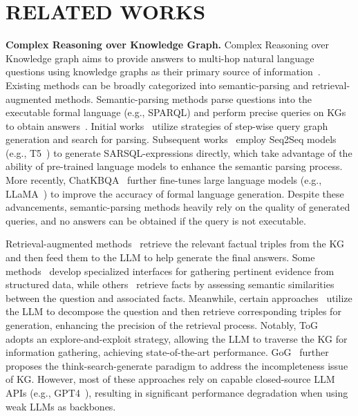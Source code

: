 \section{RELATED WORKS}
\noindent \textbf{Complex Reasoning over Knowledge Graph.} Complex Reasoning over Knowledge graph aims to provide answers to multi-hop natural language questions using knowledge graphs as their primary source of information~\cite{beamqa,chatkbqa,kgandllm}. Existing methods can be broadly categorized into semantic-parsing and retrieval-augmented methods. Semantic-parsing methods parse questions into the executable formal language (e.g., SPARQL) and perform precise queries on KGs to obtain answers~\cite{chatkbqa,spareser2}. Initial works~\cite{step,step2} utilize strategies of step-wise query graph generation and search for parsing. Subsequent works~\cite{beamqa} employ Seq2Seq models (e.g., T5~\cite{T5}) to generate SARSQL-expressions directly, which take advantage of the ability of pre-trained language models to enhance the semantic parsing process. More recently, ChatKBQA~\cite{chatkbqa} further fine-tunes large language models (e.g., LLaMA~\cite{llama}) to improve the accuracy of formal language generation. Despite these advancements, semantic-parsing methods heavily rely on the quality of generated queries, and no answers can be obtained if the query is not executable.

Retrieval-augmented methods~\cite{UniKGQA,Structgpt,Rog} retrieve the relevant factual triples from the KG and then feed them to the LLM to help generate the final answers. Some methods~\cite{Structgpt} develop specialized interfaces for gathering pertinent evidence from structured data, while others~\cite{UniKGQA,retrieval} retrieve facts by assessing semantic similarities between the question and associated facts. Meanwhile, certain approaches~\cite{chatrule,decom} utilize the LLM to decompose the question and then retrieve corresponding triples for generation, enhancing the precision of the retrieval process. Notably, ToG~\cite{ToG} adopts an explore-and-exploit strategy, allowing the LLM to traverse the KG for information gathering, achieving state-of-the-art performance. GoG~\cite{gog} further proposes the think-search-generate paradigm to address the incompleteness issue of KG. However, most of these approaches rely on capable closed-source LLM APIs (e.g., GPT4~\cite{gpt4}), resulting in significant performance degradation when using weak LLMs as backbones. 



